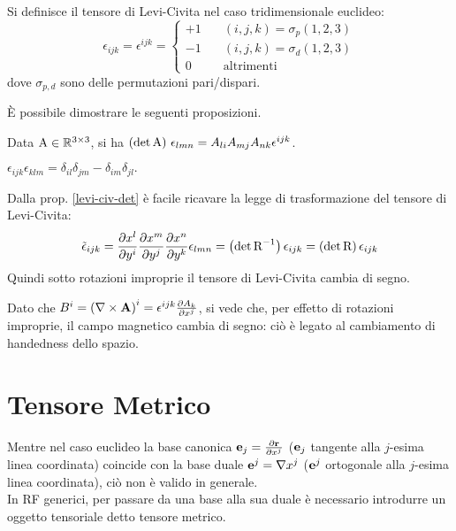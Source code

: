 \begin{definition}
	Si definisce il tensore di Levi-Civita nel caso tridimensionale euclideo:
	\begin{equation}
		\epsilon_{ijk} = \epsilon^{ijk} = 
		\begin{cases}
			+1 &\quad (i,j,k) = \sigma_p(1,2,3) \\
			-1 &\quad (i,j,k) = \sigma_d(1,2,3) \\
			0  &\quad \text{altrimenti}
		\end{cases}
		\label{eq:10}
	\end{equation}
	dove $ \sigma_{p,d} $ sono delle permutazioni pari/dispari.
\end{definition}

È possibile dimostrare le seguenti proposizioni.

\begin{proposition}\label{levi-civ-det}
	Data $ \mathbf{\text{A}} \in \mathbb{R}^{3\times 3} $, si ha $ \left(\det\mathbf{\text{A}}\right)\, \epsilon_{lmn} = A_{li} A_{mj} A_{nk} \epsilon^{ijk} $.
\end{proposition}

\begin{proposition}\label{epsilon-delta}
	$ \epsilon_{ijk}\epsilon_{klm} = \delta_{il}\delta_{jm} - \delta_{im}\delta_{jl}.$
\end{proposition}

Dalla prop. \ref{levi-civ-det} è facile ricavare la legge di trasformazione del tensore di Levi-Civita:
\begin{equation}
	\tilde{\epsilon}_{ijk} = \frac{\partial x^l}{\partial y^i} \frac{\partial x^m}{\partial y^j} \frac{\partial x^n}{\partial y^k} \epsilon_{lmn} = \left(\det\mathbf{\text{R}}^{-1}\right) \epsilon_{ijk} = \left(\det\mathbf{\text{R}}\right) \epsilon_{ijk}
	\label{eq:11}
\end{equation}
Quindi sotto rotazioni improprie il tensore di Levi-Civita cambia di segno.

\begin{example}
	Dato che $ B^i = \left(\nabla\times\mathbf{A}\right)^i = \epsilon^{ijk}\frac{\partial A_k}{\partial x^j}$, si vede che, per effetto di rotazioni improprie, il campo magnetico cambia di segno: ciò è legato al cambiamento di handedness dello spazio.
\end{example}


\section{Tensore Metrico}


Mentre nel caso euclideo la base canonica $ \mathbf{e}_j = \frac{\partial \mathbf{r}}{\partial x^j} $ ($ \mathbf{e}_j $ tangente alla $ j $-esima linea coordinata) coincide con la base duale $ \mathbf{e}^j = \nabla x^j $ ($ \mathbf{e}^j $ ortogonale alla $ j $-esima linea coordinata), ciò non è valido in generale.\\
In RF generici, per passare da una base alla sua duale è necessario introdurre un oggetto tensoriale detto tensore metrico.

